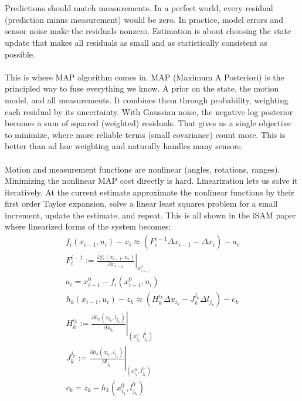 \\ \\
Predictions should match measurements. In a perfect world, every residual (prediction minus measurement) would be zero. In practice, model errors and sensor noise make the residuals nonzero. Estimation is about choosing the state update that makes all residuals as small and as statistically consistent as possible.
\\ \\
This is where MAP algorithm comes in. MAP (Maximum A Posteriori) is the principled way to fuse everything we know. A prior on the state, the motion model, and all measurements. It combines them through probability, weighting each residual by its uncertainty. With Gaussian noise, the negative log posterior becomes a sum of squared (weighted) residuals. That gives us a single objective to minimize, where more reliable terms (small covariance) count more. This is better than ad hoc weighting and naturally handles many sensors.
\\ \\
Motion and measurement functions are nonlinear (angles, rotations, ranges). Minimizing the nonlinear MAP cost directly is hard. Linearization lets us solve it iteratively. At the current estimate approximate the nonlinear functions by their first order Taylor expansion, solve a linear least squares problem for a small increment, update the estimate, and repeat. This is all shown in the iSAM paper \cite{iSAM_paper} where linearized forms of the system becomes:
\begin{equation}
    \begin{aligned}
        f_{i}(x_{i-1}, u_i) - x_i \approx (F_{i}^{i-1}\Delta x_{i-1} - \Delta x_{i}) - a_i \\
        \left.F_{i}^{i-1} := \frac{\partial f_{i}(x_{i-1}, u_i)}{\partial x_{i-1}}\right|_{x_{i-1}^{0}} \\ 
        a_i = x_{i-1}^{0} - f_{i}(x_{i-1}^{0}, u_i)
    \end{aligned}
    \label{eq:optimizer-iSAM-linearized-odometry}
\end{equation}
\begin{equation}
    \begin{aligned}
        h_{k}(x_{i-1}, u_i) - z_k \approx (H_{k}^{i_k}\Delta x_{i_k} - J_{k}^{j_k} \Delta l_{j_k}) - c_k \\
        \left.H_{k}^{i_k} := \frac{\partial h_{k}(x_{i_k}, l_{j_k})}{\partial x_{i_k}}\right|_{(x_{i_k}^{0}, l_{j_k}^{0})} \\ 
        \left.J_{k}^{j_k} := \frac{\partial h_{k}(x_{i_k}, l_{j_k})}{\partial l_{j_k}}\right|_{(x_{i_k}^{0}, l_{j_k}^{0})} \\ 
        c_k = z_{k} - h_{k}(x_{i_k}^{0}, l_{j_k}^{0})
    \end{aligned}
    \label{eq:optimizer-iSAM-linearized-measurement}
\end{equation}
